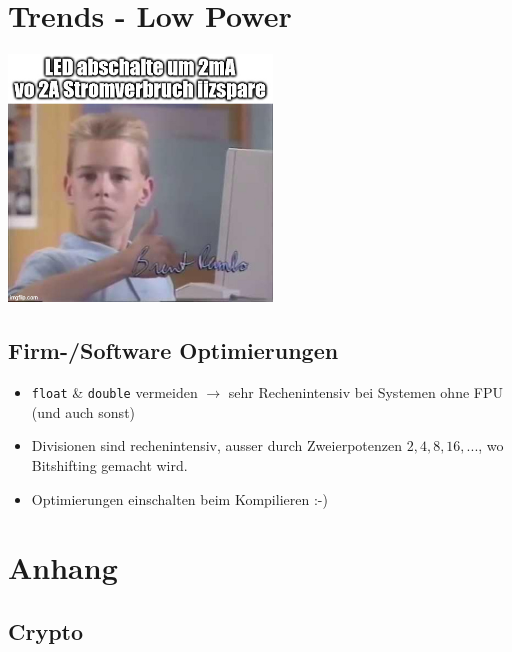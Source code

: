 \documentclass[
  10pt,
  a4paper,
  twocolumn]{article}
\providecommand{\tightlist}{%
  \setlength{\itemsep}{0pt}\setlength{\parskip}{0pt}}\usepackage{longtable,booktabs,array}
\begin{document}
\subsection{}\label{section}

\section{Trends - Low Power}\label{trends---low-power}

\begin{center}
\includegraphics[width=7cm,height=\textheight]{images/trends_meme.jpg}
\end{center}

\subsection{Firm-/Software
Optimierungen}\label{firm-software-optimierungen}

\begin{itemize}
\tightlist
\item
  \texttt{float} \& \texttt{double} vermeiden \(\rightarrow\) sehr
  Rechenintensiv bei Systemen ohne FPU (und auch sonst)
\item
  Divisionen sind rechenintensiv, ausser durch Zweierpotenzen
  \(2,4,8,16,...\), wo Bitshifting gemacht wird.
\item
  Optimierungen einschalten beim Kompilieren :-)
\end{itemize}

\newpage

\section{Anhang}\label{anhang}

\subsection{Crypto}\label{crypto-1}
\end{document}
